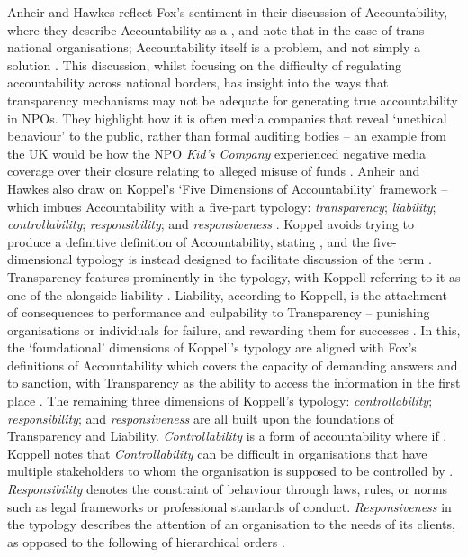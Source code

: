 %
Anheir and Hawkes reflect Fox's sentiment in their discussion of Accountability, where they describe Accountability as a , and note that in the case of trans-national organisations; Accountability itself is a problem, and not simply a solution \cite{anheier_accountability_2009}. This discussion, whilst focusing on the difficulty of regulating accountability across national borders, has insight into the ways that transparency mechanisms may not be adequate for generating true accountability in NPOs. They highlight how it is often media companies that reveal `unethical behaviour' to the public, rather than formal auditing bodies -- an example from the UK would be how the NPO \textit{Kid's Company} experienced negative media coverage over their closure relating to alleged misuse of funds \cite{elgot_kids_2015, anheier_accountability_2009}. Anheir and Hawkes also draw on Koppel's `Five Dimensions of Accountability' framework -- which imbues Accountability with a five-part typology: \textit{transparency}; \textit{liability}; \textit{controllability}; \textit{responsibility}; and \textit{responsiveness} \cite{anheier_accountability_2009, koppell_pathologies_2005}.
%
Koppel avoids trying to produce a definitive definition of Accountability, stating , and the five-dimensional typology is instead designed to facilitate discussion of the term \cite{koppell_pathologies_2005}. Transparency features prominently in the typology, with Koppell referring to it as one of the  alongside liability \cite{koppell_pathologies_2005}. Liability, according to Koppell, is the attachment of consequences to performance and culpability to Transparency -- punishing organisations or individuals for failure, and rewarding them for successes \cite{koppell_pathologies_2005}. In this, the `foundational' dimensions of Koppell's typology are aligned with Fox's definitions of Accountability which covers the capacity of demanding answers and to sanction, with Transparency as the ability to access the information in the first place \cite{koppell_pathologies_2005, fox_uncertain_2007}.
%
The remaining three dimensions of Koppell's typology: \textit{controllability}; \textit{responsibility}; and \textit{responsiveness} are all built upon the foundations of Transparency and Liability. \textit{Controllability} is a form of accountability where if  \cite{koppell_pathologies_2005}. Koppell notes that \textit{Controllability} can be difficult in organisations that have multiple stakeholders to whom the organisation is supposed to be controlled by \citep{koppell_pathologies_2005}. \textit{Responsibility} denotes the constraint of behaviour through laws, rules, or norms such as legal frameworks or professional standards of conduct. \textit{Responsiveness} in the typology describes the attention of an organisation to the needs of its clients, as opposed to the following of hierarchical orders \cite{koppell_pathologies_2005}.
